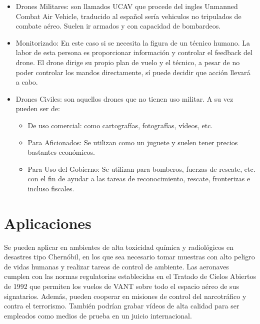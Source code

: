\begin{itemize}
\item Drones Militares: son llamados UCAV que procede del ingles Unmanned Combat Air Vehicle, traducido al español sería vehiculos no tripulados de combate aéreo. Suelen ir armados y con capacidad de bombardeos.
\item Monitorizado: En este caso si se necesita la figura de un técnico humano. La labor de esta persona es proporcionar información y controlar el feedback del drone. El drone dirige su propio plan de vuelo y el técnico, a pesar de no poder controlar los mandos directamente, sí puede decidir que acción llevará a cabo.
\item Drones Civiles: son aquellos drones que no tienen uso militar. A su vez pueden ser de: \begin{itemize}
\item De uso comercial: como cartografías, fotografías, vídeos, etc.
\item Para Aficionados: Se utilizan como un juguete y suelen tener precios bastantes económicos.
\item Para Uso del Gobierno: Se utilizan para bomberos, fuerzas de rescate, etc. con el fin de ayudar a las tareas de reconocimiento, rescate, fronterizas e incluso fiscales.
\end{itemize}
\end{itemize}

\section{Aplicaciones}
\label{sec:aplicaciones}

Se pueden aplicar en ambientes de alta toxicidad química y radiológicos en desastres tipo Chernóbil, en los que sea necesario tomar muestras con alto peligro de vidas humanas y realizar tareas de control de ambiente. Las aeronaves cumplen con las normas regulatorias establecidas en el Tratado de Cielos Abiertos de 1992 que permiten los vuelos de VANT sobre todo el espacio aéreo de sus signatarios. Además, pueden cooperar en misiones de control del narcotráfico y contra el terrorismo. También podrían grabar vídeos de alta calidad para ser empleados como medios de prueba en un juicio internacional.

